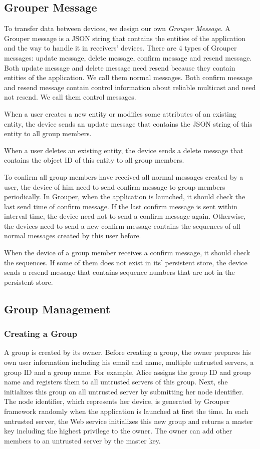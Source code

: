 \documentclass[twocolumn,10pt]{article}
\begin{document}
\subsection{Grouper Message}

To transfer data between devices, we design our own \emph{Grouper Message}. A Grouper message is a JSON string that contains the entities of the application and the way to handle it in receivers’ devices. There are 4 types of Grouper messages: update message, delete message, confirm message and resend message. Both update message and delete message need resend because they contain entities of the application. We call them normal messages. Both confirm message and resend message contain control information about reliable multicast and need not resend. We call them control messages.

When a user creates a new entity or modifies some attributes of an existing entity, the device sends an update message that contains the JSON string of this entity to all group members.

When a user deletes an existing entity, the device sends a delete message that contains the object ID of this entity to all group members.

To confirm all group members have received all normal messages created by a user, the device of him need to send confirm message to group members periodically. In Grouper, when the application is launched, it should check the last send time of confirm message. If the last confirm message is sent within interval time, the device need not to send a confirm message again. Otherwise, the devices need to send a new confirm message contains the sequences of all normal messages created by this user before.

When the device of a group member receives a confirm message, it should check the sequences. If some of them does not exist in its' persistent store, the device sends a resend message that contains sequence numbers that are not in the persistent store.

\subsection{Group Management}

\subsubsection{Creating a Group}

A group is created by its owner. Before creating a group, the owner prepares his own user information including his email and name, multiple untrusted servers, a group ID and a group name. For example, Alice assigns the group ID and group name and registers them to all untrusted servers of this group. Next, she initializes this group on all untrusted server by submitting her node identifier. The node identifier, which represents her device, is generated by Grouper framework randomly when the application is launched at first the time. In each untrusted server, the Web service initializes this new group and returns a master key including the highest privilege to the owner. The owner can add other members to an untrusted server by the master key.
\end{document}
